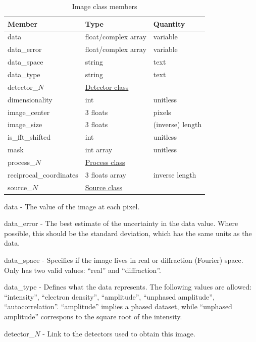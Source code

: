 \documentclass[usletter,11pt]{article}
\newcommand{\member}[2]
{ \noindent
{ \color{softBlue}  #1 - } #2
\vspace{0.2cm}
}
\begin{document}
\begin{table}[h!]\sffamily \footnotesize
\caption{Image class members}

\begin{tabular}{p{4.5cm} p{4.5cm}  p{2.5cm} }

\toprule
\bfseries Member     & \bfseries Type & \bfseries Quantity \\
\midrule
data &  float/complex array & variable \\
data\_error & float/complex array & variable \\
data\_space & string & text \\
data\_type & string & text \\
detector\_$N$ &  \hyperref[table:detector]{Detector class} & \\
dimensionality & int & unitless \\
image\_center & 3 floats & pixels \\
image\_size & 3 floats & (inverse) length \\
is\_fft\_shifted & int & unitless \\ 
mask & int array & unitless \\
process\_$N$ &  \hyperref[table:process]{Process class} & \\
reciprocal\_coordinates & 3 floats array & inverse length  \\
source\_$N$ &  \hyperref[table:source]{Source class} & \\
\bottomrule
\end{tabular}
\end{table}

\member{data}{The value of the image at each pixel.}

\member{data\_error}{The best estimate of the uncertainty in the data
 value. Where possible, this should be the standard deviation, which
 has the same units as the data.}

\member{data\_space}{Specifies if the image lives in real or diffraction (Fourier)
 space. Only has two valid values: ``real'' and ``diffraction''. }

\member{data\_type}{Defines what the data represents. The following
  values are allowed: ``intensity'', ``electron density'',
  ``amplitude'', ``unphased amplitude'',
  ``autocorrelation''. ``amplitude'' implies a phased dataset, while
  ``unphased amplitude'' correspons to the square root of the intensity.}

\member{detector\_$N$}{Link to the detectors used to obtain this
image.}
\end{document}
